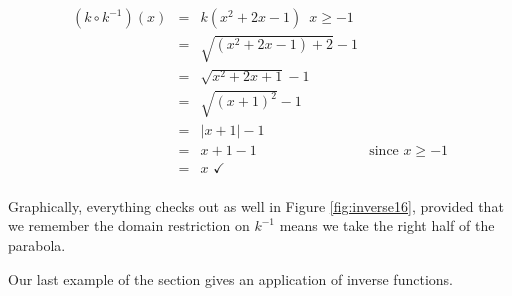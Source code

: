 {\begin{enumerate}
\[\begin{array}{rclr}
\left(k \circ k^{-1} \right)(x) & = & k\left( x^2+2x-1 \right) \, \, \, x \geq -1 & \\ 

& = & \sqrt{\left(x^2+2x-1\right)+2}-1 & \\

& = & \sqrt{x^2+2x+1}-1 & \\

& = & \sqrt{(x+1)^2}-1 & \\

& = & |x+1| -1 & \\

& = & x+1 -1 & \mbox{since $x \geq -1$}\\

& = & x \, \, \checkmark &\\

\end{array}\]

\enlargethispage{2\baselineskip}
Graphically, everything checks out as well in Figure \ref{fig:inverse16}, provided that we remember the domain restriction on $k^{-1}$ means we take the right half of the parabola.


\end{enumerate}
}

\pagebreak

Our last example of the section gives an application of inverse functions.  

\medskip

